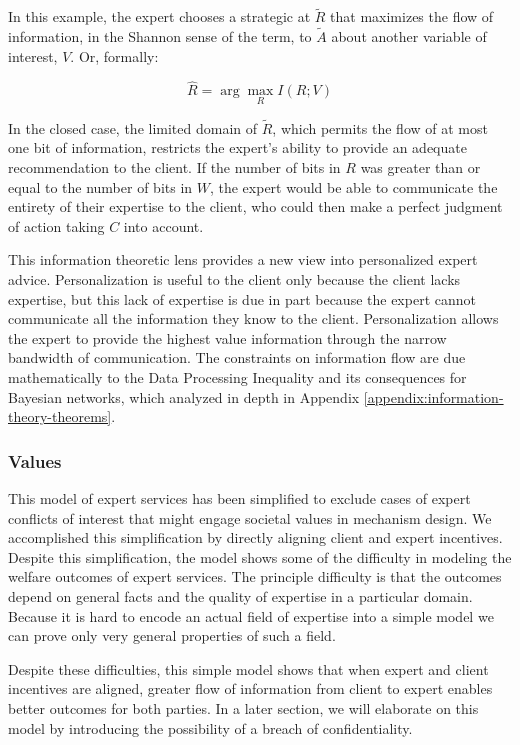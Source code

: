 \documentclass[../thesis.tex]{subfiles}
\begin{document}
In this example, the expert chooses a strategic at
$\tilde{R}$ that maximizes the flow of information,
in the Shannon sense of the term,
to $\tilde{A}$ about another variable of interest,
$V$. Or, formally:

$$\hat{R} = \arg \max_{R} I(R;V)$$

In the closed case, the limited domain of $\tilde{R}$,
which permits the flow of at most one bit of information,
restricts the expert's ability to provide an adequate
recommendation to the client.
If the number of bits in $R$ was greater than or
equal to the number of bits in $W$, the expert would
be able to communicate the entirety of their expertise
to the client, who could then make a perfect judgment
of action taking $C$ into account.

This information theoretic lens provides a new view
into personalized expert advice.
Personalization is useful to the client only because
the client lacks expertise, but this lack of expertise
is due in part because the expert cannot communicate
all the information they know to the client.
Personalization allows the expert to provide the highest
value information through the narrow bandwidth of
communication.
The constraints on information flow are due mathematically
to the Data Processing Inequality and its consequences
for Bayesian networks, which analyzed in depth in
Appendix \ref{appendix:information-theory-theorems}.

\subsubsection{Values}

This model of expert services has been simplified
to exclude cases of expert conflicts of interest
that might engage societal values in mechanism
design.
We accomplished this simplification by directly
aligning client and expert incentives.
Despite this simplification, the model
shows some of the difficulty in modeling
the welfare outcomes of expert services.
The principle difficulty is that the outcomes
depend on general facts and the quality of
expertise in a particular domain.
Because it is hard to encode an actual field
of expertise into a simple model we can prove only
very general properties of
such a field.

Despite these difficulties, this simple model
shows that when expert and client incentives
are aligned, greater flow of information
from client to expert enables better outcomes
for both parties.
In a later section, we will elaborate
on this model by introducing the possibility
of a breach of confidentiality.
\end{document}
